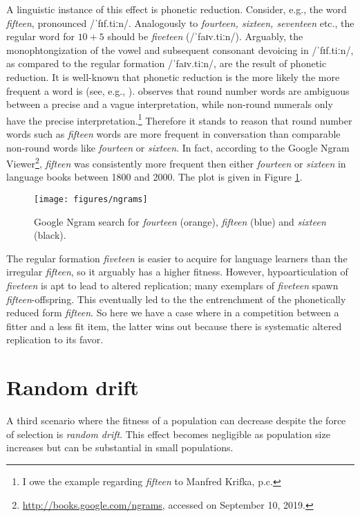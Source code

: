 \documentclass[output=paper,hidelinks]{langscibook}
\begin{document}
A linguistic instance of this effect is phonetic reduction. Consider, e.g., the 
word \emph{fifteen}, pronounced /ˈfɪf.tiːn/. Analogously to \emph{fourteen, sixteen,
  seventeen} etc., the regular word for $10+5$ should be \emph{fiveteen}
(/ˈfaɪv.tiːn/). Arguably, the monophtongization of the vowel and subsequent consonant
devoicing in /ˈfɪf.tiːn/, as compared to the regular formation /ˈfaɪv.tiːn/, are the
result of phonetic reduction. It is well-known that phonetic reduction is the more likely
the more frequent a word is (see, e.g., \citealt{ernestus2000}). \citet{krifka07} observes
that round number words are ambiguous between a precise and a vague interpretation, while
non-round numerals only have the precise interpretation.\footnote{I owe the example
  regarding \emph{fifteen} to Manfred Krifka, p.c.} Therefore it stands to reason that
round number words such as \emph{fifteen} words are more frequent in conversation than
comparable non-round words like \emph{fourteen} or \emph{sixteen}. In fact, according to
the Google Ngram Viewer\footnote{\url{http://books.google.com/ngrams}, accessed on
  September 10, 2019.}, \emph{fifteen} was consistently more frequent then either
\emph{fourteen} or \emph{sixteen} in  language books between 1800 and 2000. The
plot is given in Figure \ref{fig:3}.

\begin{figure}
  \centering
  \texttt{[image: figures/ngrams]}
  \caption{Google Ngram search for \emph{fourteen} (orange), \emph{fifteen} (blue) and
    \emph{sixteen} (black).}
  \label{fig:3}
\end{figure}

The regular formation \emph{fiveteen} is easier to acquire for language learners than the
irregular \emph{fifteen}, so it arguably has a higher fitness. However, hypoarticulation
of \emph{fiveteen} is apt to lead to altered replication; many exemplars of
\emph{fiveteen} spawn \emph{fifteen}-offspring. This eventually led to the the
entrenchment of the phonetically reduced form \emph{fifteen}. So here we have a case where
in a competition between a fitter and a less fit item, the latter wins out because there
is systematic altered replication to its favor.

\section{Random drift}

A third scenario where the fitness of a population can decrease despite the force of
selection is \emph{random drift}. This effect becomes negligible as population size
increases but can be substantial in small populations.
\end{document}
